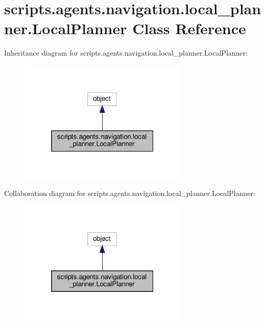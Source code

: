 \hypertarget{classscripts_1_1agents_1_1navigation_1_1local__planner_1_1LocalPlanner}{}\section{scripts.\+agents.\+navigation.\+local\+\_\+planner.\+Local\+Planner Class Reference}
\label{classscripts_1_1agents_1_1navigation_1_1local__planner_1_1LocalPlanner}


Inheritance diagram for scripts.\+agents.\+navigation.\+local\+\_\+planner.\+Local\+Planner\+:\nopagebreak
\begin{figure}[H]
\begin{center}
\leavevmode
\includegraphics[width=229pt]{d1/d35/classscripts_1_1agents_1_1navigation_1_1local__planner_1_1LocalPlanner__inherit__graph}
\end{center}
\end{figure}


Collaboration diagram for scripts.\+agents.\+navigation.\+local\+\_\+planner.\+Local\+Planner\+:\nopagebreak
\begin{figure}[H]
\begin{center}
\leavevmode
\includegraphics[width=229pt]{d5/d45/classscripts_1_1agents_1_1navigation_1_1local__planner_1_1LocalPlanner__coll__graph}
\end{center}
\end{figure}
